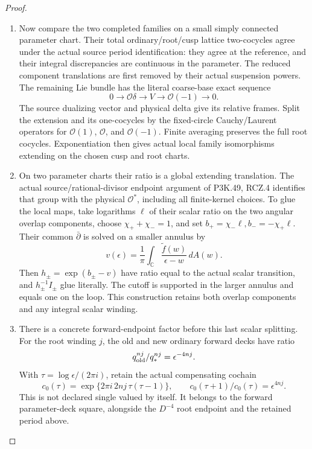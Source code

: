 \begin{proof}
\begin{enumerate}[label=\arabic*.]
\item Now compare the two completed families on a
small simply connected parameter chart.
Their total ordinary/root/cusp lattice
two-cocycles agree under the actual source
period identification: they agree at the
reference, and their integral discrepancies
are continuous in the parameter. The reduced
component translations are first removed by
their actual suspension powers. The remaining
Lie bundle has the literal coarse-base exact
sequence
\[
     0\longrightarrow\mathcal O\delta
       \longrightarrow V\longrightarrow\mathcal O(-1)
       \longrightarrow0 .
\]
The source dualizing vector and physical delta
give its relative frames. Split the extension
and its one-cocycles by the fixed-circle
Cauchy/Laurent operators for \(\mathcal O(1)\),
\(\mathcal O\), and \(\mathcal O(-1)\).
Finite averaging preserves the full root
cocycles. Exponentiation then gives actual
local family isomorphisms extending on the
chosen cusp and root charts.

\item On two parameter charts their ratio is a
global extending translation. The actual
source/rational-divisor endpoint argument
of P3K.49, RCZ.4 identifies that group with the
physical \(\mathcal O^*\), including all
finite-kernel choices. To glue the local
maps, take logarithms \(\ell\) of their
scalar ratio on the two angular overlap
components, choose \(\chi_++\chi_-=1\),
and set \(b_+=\chi_-\ell,b_-=-\chi_+\ell\).
Their common \(\bar\partial\) is solved on
a smaller annulus by
\[
 v(\epsilon)=\frac1\pi\int_{\mathbb C}
       \frac{\widetilde f(w)}{\epsilon-w}\,dA(w).
\]
Then \(h_\pm=\exp(b_\pm-v)\) have ratio
equal to the actual scalar transition,
and \(h_\pm^{-1}I_\pm\) glue literally.
The cutoff is supported in the larger
annulus and equals one on the loop.
This construction retains both overlap
components and any integral scalar winding.

\item There is a concrete forward-endpoint
factor before this last scalar splitting.
For the root winding \(j\), the old and
new ordinary forward decks have ratio
\[
      q_{\rm old}^{nj}/q_*^{nj}
                         =\epsilon^{-4nj}.
\]
With \(\tau=\log\epsilon/(2\pi i)\), retain
the actual compensating cochain
\[
 c_0(\tau)=\exp\{2\pi i\,2nj\,\tau(\tau-1)\},
 \qquad
 c_0(\tau+1)/c_0(\tau)=\epsilon^{4nj}.                 \tag{P3K.57.IF.33}
\]
This is not declared single valued by
itself. It belongs to the forward
parameter-deck square, alongside the
\(D^{-4}\) root endpoint and the
retained period above.


\end{enumerate}
\end{proof}
